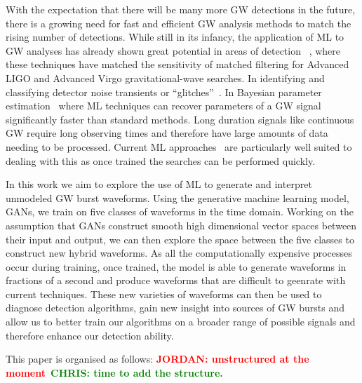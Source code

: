 \documentclass[12pt]{iopart}
\newcommand{\jordan}[1]{\textbf{\textcolor{red}{JORDAN: #1}}}
\newcommand{\chris}[1]{\textbf{\textcolor{green}{CHRIS: #1}}}
\begin{document}
%
With the expectation that there will be many more \ac{GW} detections in the
future, there is a growing need for fast and efficient \ac{GW} analysis methods
to match the rising number of detections. While still in its infancy, the application of \ac{ML} to \ac{GW} analyses has already shown great potential in areas of detection ~\cite{Gabbard2017,Gebhard_2019,Krastev_2020}, where these techniques have matched the sensitivity of matched filtering for Advanced LIGO and Advanced Virgo gravitational-wave searches. In identifying and classifying detector noise transients or  ``glitches''~\cite{Bahaadini, George_2018,Razzano_2018, 2020arXiv200801262G}. In Bayesian parameter
estimation~\cite{gabbard2019bayesian, green2020gravitationalwave} where \ac{ML} techniques can recover parameters of a \ac{GW} signal significantly faster than standard methods. Long duration signals like continuous \ac{GW} require long observing times and therefore have large amounts of data needing to be processed. Current \ac{ML} approaches~\cite{2020PhRvD.102b2005D, 2019PhRvD.100d4009D, 2020arXiv200708207B} are particularly well suited to dealing with this as once trained the searches can be performed quickly.

%
In this work we aim to explore the use of \ac{ML} to generate and interpret
unmodeled \ac{GW} burst waveforms. Using the generative machine learning
model, \acp{GAN}, we train on five classes of waveforms in the time domain. Working on the assumption that \acp{GAN} construct smooth
 high dimensional vector spaces between their input and output, we can then
explore the space between the five classes to construct new
hybrid waveforms. As all the computationally expensive
processes occur during training, once trained, the model is able to
generate waveforms in fractions of a second and produce waveforms that are difficult to geenrate with current
techniques. These new varieties of waveforms can then be used to diagnose
detection algorithms, gain new insight into sources of \ac{GW}
bursts and  allow us to better train our algorithms on a
broader range of possible signals and therefore enhance our detection ability. 

%
This paper is organised as follows: \jordan{unstructured at the
moment}~\chris{time to add the structure.}

\end{document}
